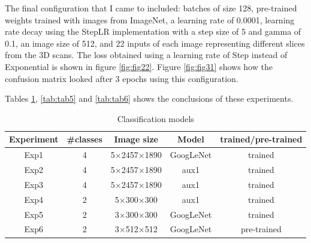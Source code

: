 The final configuration that I came to included: batches of size 128, pre-trained weights trained with images from ImageNet, a learning rate of 0.0001, learning rate decay using the StepLR implementation with a step size of 5 and gamma of 0.1, an image size of 512, and 22 inputs of each image representing different slices from the 3D scans. The loss obtained using a learning rate of Step instead of Exponential is shown in figure \ref{fig:fig22}. Figure \ref{fig:fig31} shows how the confusion matrix looked after 3 epochs using this configuration.

Tables \ref{tab:tab4}, \ref{tab:tab5} and \ref{tab:tab6} shows the conclusions of these experiments.

\begin{table}[!ht]
    \centering
    \begin{tabular}{|c|c|c|c|c|}
        \hline
        Experiment & \#classes & Image size & Model & trained/pre-trained\\
        \hline\hline
        Exp1 & 4 & 5$\times$2457$\times$1890 & GoogLeNet & trained \\
        \hline
        Exp2 & 4 & 5$\times$2457$\times$1890 & aux1 & trained \\
        \hline
        Exp3 & 4 & 5$\times$2457$\times$1890 & aux1 & trained \\
        \hline
        Exp4 & 2 & 5$\times$300$\times$300 & aux1 & trained \\
        \hline
        Exp5 & 2 & 3$\times$300$\times$300 & GoogLeNet & trained \\
        \hline 
        Exp6 & 2 & 3$\times$512$\times$512 & GoogLeNet & pre-trained \\
        \hline
    \end{tabular}
    \caption{Classification models}
    \label{tab:tab4}
\end{table}

